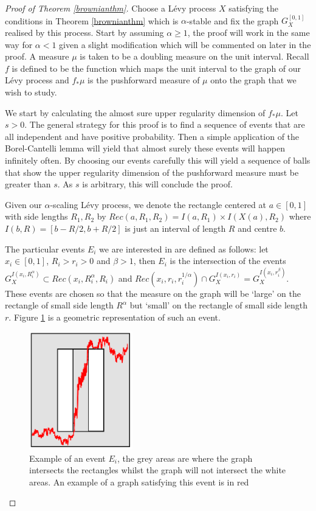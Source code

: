 \begin{proof}[Proof of Theorem \ref{brownianthm}]



Choose a L\'evy process $X$ satisfying the conditions in Theorem \ref{brownianthm} which is $\alpha$-stable and fix the graph $G_X^{[0,1]}$ realised by this process. Start by assuming $\alpha \ge 1$, the proof will work in the same way for $\alpha < 1$ given a slight modification which will be commented on later in the proof. A measure $\mu$ is taken to be a doubling measure on the unit interval. Recall $f$ is defined to be the function which maps the unit interval to the graph of our L\'evy process and $f_*\mu$ is the pushforward measure of $\mu$ onto the graph that we wish to study.

We start by calculating the almost sure upper regularity dimension of $f_*\mu$. Let $s>0$. The general strategy for this proof is to find a sequence of events that are all independent and have positive probability. Then a simple application of the Borel-Cantelli lemma will yield that almost surely these events will happen infinitely often. By choosing our events carefully this will yield a sequence of balls that show the upper regularity dimension of the pushforward measure must be greater than $s$. As $s$ is arbitrary, this will conclude the proof.

Given our $\alpha$-scaling L\'evy process, we denote the rectangle centered at $a\in [0,1]$ with side lengths $R_1,R_2$ by $Rec(a,R_1,R_2) = I(a,R_1) \times I(X(a),R_2)$ where $I(b,R) = [b-R/2,b+R/2]$ is just an interval of length $R$ and centre $b$. 

The particular events $E_i$ we are interested in are defined as follows: let $x_i \in [0,1]$, $R_i > r_i> 0$ and $\beta > 1$, then $E_i$ is the intersection of the events $G_X^{I(x_i,R_i^{\alpha})} \subset Rec(x_i,R_i^{\alpha},R_i)$ and $Rec(x_i, r_i, r_i^{1/\alpha}) \cap G_X^{I(x_i,r_i)} = G_X^{I(x_i,r_i^{\beta})}$. These events are chosen so that the measure on the graph will be `large' on the rectangle of small side length $R^{\alpha}$ but `small' on the rectangle of small side length $r$. Figure \ref{brownian_event} is a geometric representation of such an event.  

\begin{figure}[htbp]
	\centering
	\includegraphics[width=0.4\textwidth]{pics/ch-brownian/new_rectangles.png}
	\caption{Example of an event $E_i$, the grey areas are where the graph intersects the rectangles whilst the graph will not intersect the white areas. An example of a graph satisfying this event is in red}
	\label{brownian_event}
\end{figure}


\end{proof}
